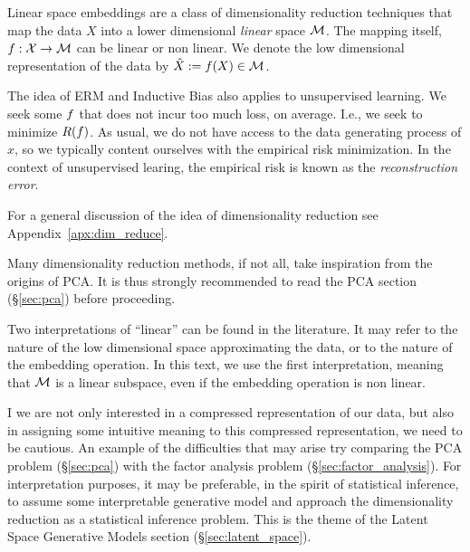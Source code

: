 Linear space embeddings are a class of dimensionality reduction techniques that map the data $X$ into a lower dimensional \emph{linear} space $\mathcal{M}$. 
The mapping itself, $f: \mathcal{X} \to \mathcal{M}$ can be linear or non linear.
We denote the low dimensional representation of the data by $\hat{X}:=f(X) \in \mathcal{M}$.

The idea of ERM and Inductive Bias also applies to unsupervised learning.
We seek some $f$ that does not incur too much loss, on average. I.e., we seek to minimize $R(f)$.
As usual, we do not have access to the data generating process of $x$, so we typically content ourselves with the empirical risk minimization.
In the context of unsupervised learing, the empirical risk is known as the \emph{reconstruction error}.

For a general discussion of the idea of dimensionality reduction see Appendix~\ref{apx:dim_reduce}.

Many dimensionality reduction methods, if not all, take inspiration from the origins of PCA. 
It is thus strongly recommended to read the PCA section (\S\ref{sec:pca}) before proceeding.

\begin{remark}
\label{remark:linear}
	Two interpretations of ``linear'' can be found in the literature. It may refer to the nature of the low dimensional space approximating the data, or to the nature of the embedding operation. In this text, we use the first interpretation, meaning that $\mathcal{M}$ is a linear subspace, even if the embedding operation is non linear.
\end{remark}


\begin{remark}
I we are not only interested in a compressed representation of our data, but also in assigning some intuitive meaning to this compressed representation, we need to be cautious. 
An example of the difficulties that may arise try comparing the PCA problem (\S\ref{sec:pca}) with the factor analysis problem (\S\ref{sec:factor_analysis}).
For interpretation purposes, it may be preferable, in the spirit of statistical inference, to assume some interpretable generative model and approach the dimensionality reduction as a statistical inference problem.
This is the theme of the Latent Space Generative Models section (\S\ref{sec:latent_space}).
\end{remark}





